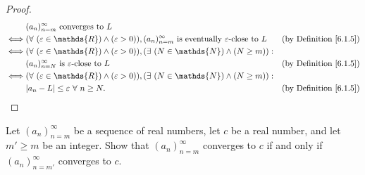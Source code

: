\begin{proof}
\begin{align*}
& (a_n)_{n = m}^\infty \text{ converges to } L \\
\iff & (\forall\ (\varepsilon \in \mathds{R}) \land (\varepsilon > 0)), (a_n)_{n = m}^\infty \text{ is eventually } \varepsilon\text{-close to } L & \text{(by Definition \ref{6.1.5})} \\
\iff & (\forall\ (\varepsilon \in \mathds{R}) \land (\varepsilon > 0)), (\exists\ (N \in \mathds{N}) \land (N \geq m)) : \\
& (a_n)_{n = N}^\infty \text{ is } \varepsilon\text{-close to } L & \text{(by Definition \ref{6.1.5})} \\
\iff & (\forall\ (\varepsilon \in \mathds{R}) \land (\varepsilon > 0)), (\exists\ (N \in \mathds{N}) \land (N \geq m)) : \\
& \abs*{a_n - L} \leq \varepsilon \ \forall\ n \geq N. & \text{(by Definition \ref{6.1.5})}
\end{align*}
\end{proof}

\begin{exercise}\label{ex 6.1.3}
Let \((a_n)_{n = m}^\infty\) be a sequence of real numbers, let \(c\) be a real number, and let \(m' \geq m\) be an integer.
Show that \((a_n)_{n = m}^\infty\) converges to \(c\) if and only if \((a_n)_{n = m'}^\infty\) converges to \(c\).
\end{exercise}

